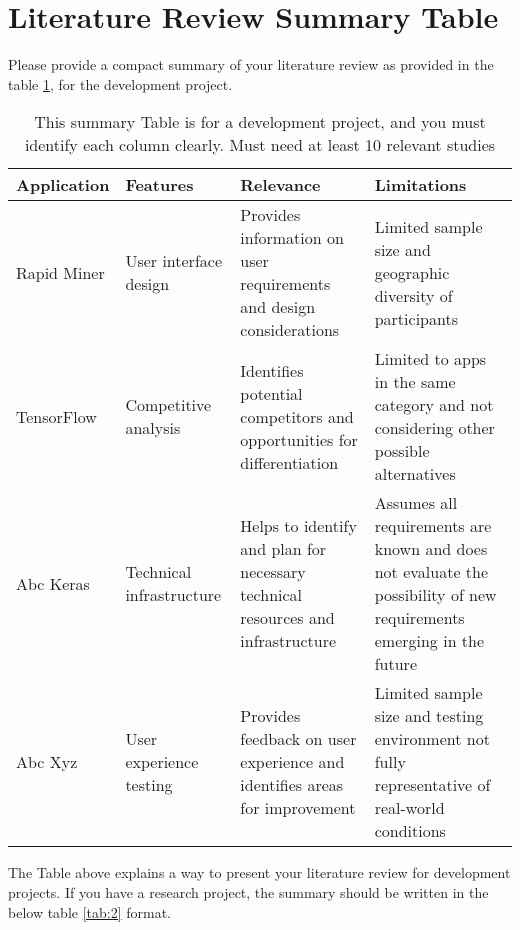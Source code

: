 \documentclass{FastFyp}
\begin{document}
\section{Literature Review Summary Table}
Please provide a compact summary of your literature review as provided in the table \ref{tab:1}, for the development project.
\begin{table}[!h]
\centering
\caption{This summary Table is for a development project, and you must identify each column clearly. Must need at least 10 relevant studies}
\begin{tabular}{|p{2.5cm}|p{2.5cm}|p{4cm}|p{5cm}|}
\hline
    \textbf{Application} & \textbf{Features} & \textbf{Relevance} & \textbf{Limitations} \\
\hline
Rapid Miner \cite{ref:Duda:2000} & User interface design & Provides information on user requirements and design considerations & Limited sample size and geographic diversity of participants \\
\hline
TensorFlow \cite{ref:SVMGuide} & Competitive analysis & Identifies potential competitors and opportunities for differentiation & Limited to apps in the same category and not considering other possible alternatives \\
\hline
Abc Keras \cite{ref:guyon:2007} & Technical infrastructure & Helps to identify and plan for necessary technical resources and infrastructure & Assumes all requirements are known and does not evaluate the possibility of new requirements emerging in the future \\
\hline
Abc Xyz \cite{ref:guyon:2007a} & User experience testing & Provides feedback on user experience and identifies areas for improvement & Limited sample size and testing environment not fully representative of real-world conditions \\
\hline
\end{tabular}
\label{tab:1}
\end{table}
The Table above explains a way to present your literature review for development projects. If you have a research project, the summary should be written in the below table \ref{tab:2} format.
\end{document}
